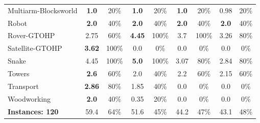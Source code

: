 \begin{table}
\begin{tabular}{|l|cc|cc|cc|cc|}
	Multiarm-Blocksworld & \textbf{1.0} & 20\%  & \textbf{1.0} & 20\%  & \textbf{1.0} & 20\%  & 0.98 & 20\%  \\
	Robot & \textbf{2.0} & 40\%  & \textbf{2.0} & 40\%  & \textbf{2.0} & 40\%  & \textbf{2.0} & 40\%  \\
	Rover-GTOHP & 2.75 & 60\%  & \textbf{4.45} & 100\%  & 3.7 & 100\%  & 3.26 & 80\%  \\
	Satellite-GTOHP & \textbf{3.62} & 100\%  & 0.0 & 0\%  & 0.0 & 0\%  & 0.0 & 0\%  \\
	Snake & 4.45 & 100\%  & \textbf{5.0} & 100\%  & 3.07 & 80\%  & 2.84 & 80\%  \\
	Towers & \textbf{2.6} & 60\%  & 2.0 & 40\%  & 2.2 & 60\%  & 2.15 & 60\%  \\
	Transport & \textbf{2.86} & 80\%  & 1.85 & 40\%  & 0.0 & 0\%  & 0.0 & 0\%  \\
	Woodworking & \textbf{2.0} & 40\%  & 0.35 & 20\%  & 0.0 & 0\%  & 0.0 & 0\%  \\
	\hline
	\textbf{Instances: 120} & 59.4 & 64\% & 51.6 & 45\% & 44.2 & 47\% & 43.1 & 48\% \\
	\hline
\end{tabular}

\end{table}


